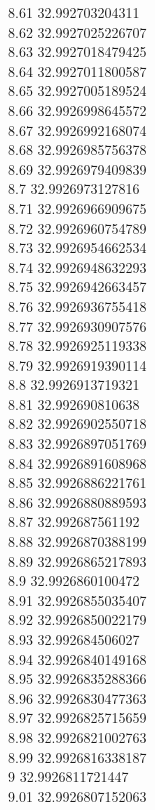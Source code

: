 {8.61	32.992703204311\\
8.62	32.9927025226707\\
8.63	32.9927018479425\\
8.64	32.9927011800587\\
8.65	32.9927005189524\\
8.66	32.9926998645572\\
8.67	32.9926992168074\\
8.68	32.9926985756378\\
8.69	32.9926979409839\\
8.7	32.9926973127816\\
8.71	32.9926966909675\\
8.72	32.9926960754789\\
8.73	32.9926954662534\\
8.74	32.9926948632293\\
8.75	32.9926942663457\\
8.76	32.9926936755418\\
8.77	32.9926930907576\\
8.78	32.9926925119338\\
8.79	32.9926919390114\\
8.8	32.9926913719321\\
8.81	32.992690810638\\
8.82	32.9926902550718\\
8.83	32.9926897051769\\
8.84	32.9926891608968\\
8.85	32.9926886221761\\
8.86	32.9926880889593\\
8.87	32.992687561192\\
8.88	32.9926870388199\\
8.89	32.9926865217893\\
8.9	32.9926860100472\\
8.91	32.9926855035407\\
8.92	32.9926850022179\\
8.93	32.992684506027\\
8.94	32.9926840149168\\
8.95	32.9926835288366\\
8.96	32.9926830477363\\
8.97	32.9926825715659\\
8.98	32.9926821002763\\
8.99	32.9926816338187\\
9	32.9926811721447\\
9.01	32.9926807152063\\
}
